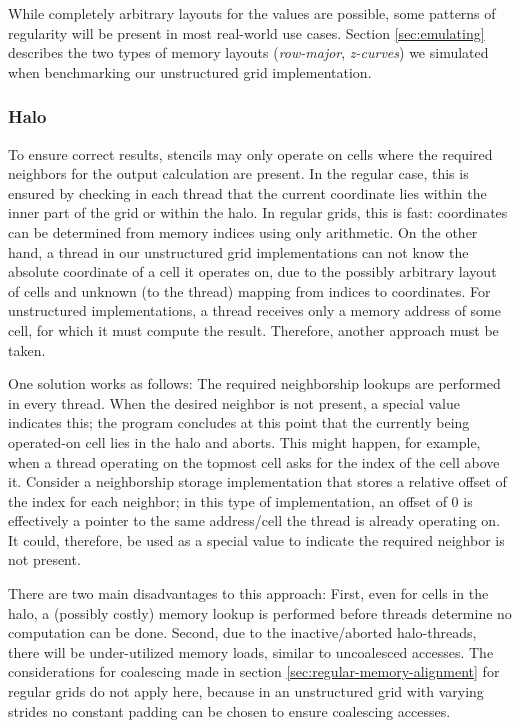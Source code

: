 While completely arbitrary layouts for the values are possible, some patterns of regularity will be present in most real-world use cases. Section \ref{sec:emulating} describes the two types of memory layouts (\emph{row-major}, \emph{z-curves}) we simulated when benchmarking our unstructured grid implementation.

\subsubsection{Halo}

To ensure correct results, stencils may only operate on cells where the required neighbors for the output calculation are present. In the regular case, this is ensured by checking in each thread that the current coordinate lies within the inner part of the grid or within the halo. In regular grids, this is fast: coordinates can be determined from memory indices using only arithmetic. On the other hand, a thread in our unstructured grid implementations can not know the absolute coordinate of a cell it operates on, due to the possibly arbitrary layout of cells and unknown (to the thread) mapping from indices to coordinates. For unstructured implementations, a thread receives only a memory address of some cell, for which it must compute the result. Therefore, another approach must be taken.

One solution works as follows: The required neighborship lookups are performed in every thread. When the desired neighbor is not present, a special value indicates this; the program concludes at this point that the currently being operated-on cell lies in the halo and aborts. This might happen, for example, when a thread operating on the topmost cell asks for the index of the cell above it. Consider a neighborship storage implementation that stores a relative offset of the index for each neighbor; in this type of implementation, an offset of $0$ is effectively a pointer to the same address/cell the thread is already operating on. It could, therefore, be used as a special value to indicate the required neighbor is not present.

There are two main disadvantages to this approach: First, even for cells in the halo, a (possibly costly) memory lookup is performed before threads determine no computation can be done. Second, due to the inactive/aborted halo-threads, there will be under-utilized memory loads, similar to uncoalesced accesses. The considerations for coalescing made in section \ref{sec:regular-memory-alignment} for regular grids do not apply here, because in an unstructured grid with varying strides no constant padding can be chosen to ensure coalescing accesses. 

